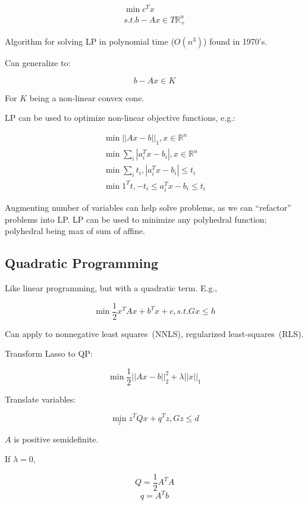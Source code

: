 \documentclass[10pt]{article}
\begin{document}
\begin{equation*}
\begin{split}
\min c^T x \\
s.t. b - Ax \in T \mathbb{R}^n_+
\end{split}
\end{equation*}

Algorithm for solving LP in polynomial time ($O(n^3)$) found in 1970's.

Can generalize to:

$$
b - Ax \in K
$$

For $K$ being a non-linear convex cone.

LP can be used to optimize non-linear objective functions, e.g.:

\begin{equation*}
\begin{split}
\min || Ax - b||_1, x \in \mathbb{R}^n \\
\min \sum_i |a_i^Tx - b_i|, x \in \mathbb{R}^n \\
\min \sum_i t_i, |a_i^Tx - b_i| \le t_i \\
\min 1^Tt, -t_i \le a_i^Tx - b_i \le t_i 
\end{split}
\end{equation*}

Augmenting number of variables can help solve problems, as we can ``refactor'' problems into
LP. LP can be used to minimize any polyhedral function; polyhedral being max of sum of affine.

\subsection{Quadratic Programming}

Like linear programming, but with a quadratic term. E.g.,

$$
\min \frac{1}{2} x^T A x + b^T x + c, s.t. Gx \le h
$$

Can apply to nonnegative least squares~(NNLS), regularized least-squares~(RLS).

Transform Lasso to QP:

$$
\min \frac{1}{2} || Ax - b ||^2_2 + \lambda ||x||_1
$$

Translate variables:

$$
\min_z z^T Q x + q^Tz, Gz \le d
$$

$A$ is positive semidefinite.

If $\lambda = 0$,

$$
Q = \frac{1}{2} A^TA
$$
$$
q = A^Tb
$$
\end{document}
